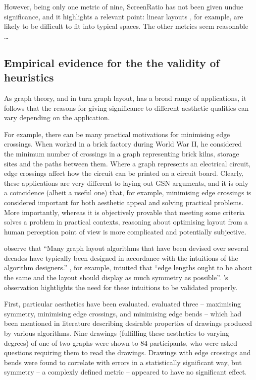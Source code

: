 However, being only one metric of nine, ScreenRatio has not been given undue significance, and it highlights a relevant point: linear layouts , for example, are likely to be difficult to fit into typical spaces.
The other metrics seem reasonable \ldots


\subsection{Empirical evidence for the the validity of heuristics}

As graph theory, and in turn graph layout, has a broad range of applications, it follows that the reasons for giving significance to different aesthetic qualities can vary depending on the application.

For example, there can be many practical motivations for minimising edge crossings.
When \citet{JGT:JGT3190010105} worked in a brick factory during World War II,
he considered the minimum number of crossings in a graph representing
brick kilns, storage sites and the paths between them.
Where a graph represents an electrical circuit, edge crossings affect how the circuit can be printed on a circuit board.
Clearly, these applications are very different to laying out GSN arguments, and it is only a coincidence (albeit a useful one) that, for example, minimising edge crossings is considered important for both aesthetic appeal and solving practical problems.
More importantly, whereas it is objectively provable that meeting some criteria solves a problem in practical contexts, reasoning about optimising layout from a human perception point of view is more complicated and potentially subjective.

\citet{5674033} observe that ``Many graph layout algorithms that have been devised over
several decades have typically been designed in accordance with the intuitions of the algorithm designers.''
\citet{eades84}, for example, intuited that ``edge lengths ought to be about the same and the layout should display as much symmetry as possible''.
\citeauthor{5674033}'s observation hightlights the need for these intuitions to be validated properly.

First, particular aesthetics have been evaluated. \citet{Purchase1997basis} evaluated three -- maximising symmetry, minimising edge crossings, and minimising edge bends -- which had been mentioned in literature describing desirable properties of drawings produced by various algorithms. 
Nine drawings (fulfilling these aesthetics to varying degrees) of one of two graphs were shown to 84 participants,
who were asked questions requiring them to read the drawings.
Drawings with edge crossings and bends were found to correlate with errors in a statistically significant way, but symmetry -- a complexly defined metric -- appeared to have no significant effect.

